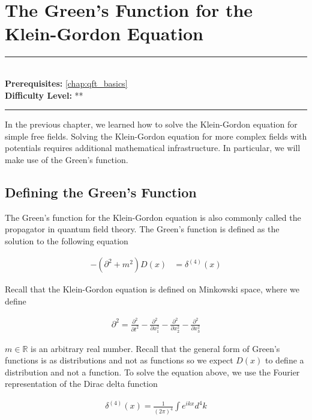 \documentclass[book.tex]{subfiles}
\begin{document}
\chapter{The Green's Function for the Klein-Gordon Equation}

\label{chap:klein_gordon_greenns}
\noindent\rule{11cm}{0.4pt} \\
\textbf{Prerequisites:} \autoref{chap:qft_basics}  \\
\textbf{Difficulty Level:} ** \\
\noindent\rule{11cm}{0.4pt}
\vspace{5mm}

In the previous chapter, we learned how to solve the Klein-Gordon equation for simple free fields. Solving the Klein-Gordon equation for more complex fields with potentials requires additional mathematical infrastructure. In particular, we will make use of the Green's function.

\section{Defining the Green's Function}

The Green's function for the Klein-Gordon equation is also commonly called the propagator in quantum field theory. The Green's function is defined as the solution to the following equation

\begin{align}
    -(\partial^2 + m^2)D(x) &= \delta^{(4)}(x)
\end{align}

Recall that the Klein-Gordon equation is defined on Minkowski space, where we define 

\begin{align}
    \partial^2 = \frac{\partial^2}{\partial t^2} - \frac{\partial^2}{\partial x_1^2} - \frac{\partial^2}{\partial x_2^2} - \frac{\partial^2}{\partial x_3^2}
\end{align}

\noindent $m \in \mathbb{R}$ is an arbitrary real number. Recall that the general form of Green's functions is as distributions and not as functions so we expect $D(x)$ to define a distribution and not a function. To solve the equation above, we use the Fourier representation of the Dirac delta function

\begin{align}
    \delta^{(4)}(x) = \frac{1}{(2\pi)^4} \int e^{ikx} d^4 k
\end{align}
\end{document}
